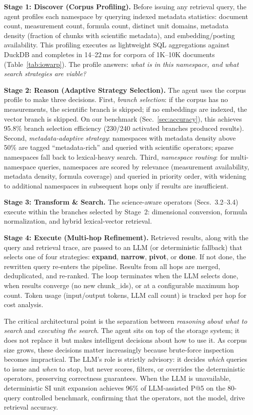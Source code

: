 \textbf{Stage 1: Discover (Corpus Profiling).} Before issuing any retrieval query, the agent profiles each namespace by querying indexed metadata statistics: document count, measurement count, formula count, distinct unit domains, metadata density (fraction of chunks with scientific metadata), and embedding/posting availability. This profiling executes as lightweight SQL aggregations against DuckDB and completes in 14--22\,ms for corpora of 1K--10K documents (Table~\ref{tab:iowarp}). The profile answers: \emph{what is in this namespace, and what search strategies are viable?}

\textbf{Stage 2: Reason (Adaptive Strategy Selection).} The agent uses the corpus profile to make three decisions. First, \emph{branch selection}: if the corpus has no measurements, the scientific branch is skipped; if no embeddings are indexed, the vector branch is skipped. On our benchmark (Sec.~\ref{sec:accuracy}), this achieves 95.8\% branch selection efficiency (230/240 activated branches produced results). Second, \emph{metadata-adaptive strategy}: namespaces with metadata density above 50\% are tagged ``metadata-rich'' and queried with scientific operators; sparse namespaces fall back to lexical-heavy search. Third, \emph{namespace routing}: for multi-namespace queries, namespaces are scored by relevance (measurement availability, metadata density, formula coverage) and queried in priority order, with widening to additional namespaces in subsequent hops only if results are insufficient.

\textbf{Stage 3: Transform \& Search.} The science-aware operators (Secs.~3.2--3.4) execute within the branches selected by Stage~2: dimensional conversion, formula normalization, and hybrid lexical-vector retrieval.

\textbf{Stage 4: Execute (Multi-hop Refinement).} Retrieved results, along with the query and retrieval trace, are passed to an LLM (or deterministic fallback) that selects one of four strategies: \textbf{expand}, \textbf{narrow}, \textbf{pivot}, or \textbf{done}. If not done, the rewritten query re-enters the pipeline. Results from all hops are merged, deduplicated, and re-ranked. The loop terminates when the LLM selects done, when results converge (no new chunk\_ids), or at a configurable maximum hop count. Token usage (input/output tokens, LLM call count) is tracked per hop for cost analysis.

The critical architectural point is the separation between \emph{reasoning about what to search} and \emph{executing the search}. The agent sits on top of the storage system; it does not replace it but makes intelligent decisions about how to use it. As corpus size grows, these decisions matter increasingly because brute-force inspection becomes impractical. The LLM's role is strictly advisory: it decides \emph{which} queries to issue and \emph{when} to stop, but never scores, filters, or overrides the deterministic operators, preserving correctness guarantees. When the LLM is unavailable, deterministic SI unit expansion achieves 96\% of LLM-assisted P@5 on the 80-query controlled benchmark, confirming that the operators, not the model, drive retrieval accuracy.


